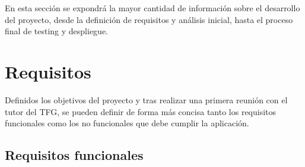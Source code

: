 En esta sección se expondrá la mayor cantidad de información sobre el desarrollo
del proyecto, desde la definición de requisitos y análisis inicial, hasta el proceso final
de testing y despliegue.

\section{Requisitos}

Definidos los objetivos del proyecto y tras realizar una primera reunión
con el tutor del TFG, se pueden definir de forma más concisa tanto los
requisitos funcionales como los no funcionales que debe cumplir la aplicación.

\subsection{Requisitos funcionales}

